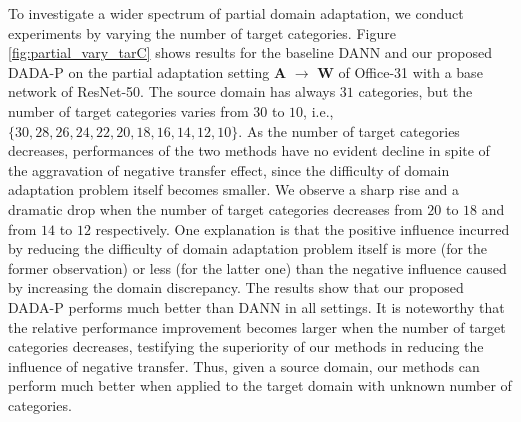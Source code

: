 \documentclass[letterpaper]{article} \usepackage{aaai20}  \usepackage{times}  \usepackage{helvet} \usepackage{courier}  \usepackage[hyphens]{url}  \usepackage{graphicx} \urlstyle{rm} \def\UrlFont{\rm}  \usepackage{graphicx}  \frenchspacing  \setlength{\pdfpagewidth}{8.5in}  \setlength{\pdfpageheight}{11in}
\begin{document}
To investigate a wider spectrum of partial domain adaptation, we conduct experiments by varying the number of target categories. Figure \ref{fig:partial_vary_tarC} shows results for the baseline DANN \cite{dann} and our proposed DADA-P on the partial adaptation setting \textbf{A} $\rightarrow$ \textbf{W} of Office-31 with a base network of ResNet-50.  The source domain has always $31$ categories, but the number of target categories varies from $30$ to $10$, i.e., $\{30, 28, 26, 24, 22, 20, 18, 16, 14, 12, 10\}$. As the number of target categories decreases, performances of the two methods have no evident decline in spite of the aggravation of negative transfer effect, since the difficulty of domain adaptation problem itself becomes smaller. We observe a sharp rise and a dramatic drop when the number of target categories decreases from $20$ to $18$ and from $14$ to $12$ respectively. One explanation is that the positive influence incurred by reducing the difficulty of domain adaptation problem itself is more (for the former observation) or less (for the latter one) than the negative influence caused by increasing the domain discrepancy. The results show that our proposed DADA-P performs much better than DANN in all settings. It is noteworthy that the relative performance improvement becomes larger when the number of target categories decreases, testifying the superiority of our methods in reducing the influence of negative transfer. Thus, given a source domain, our methods can perform much better when applied to the target domain with unknown number of categories.
\end{document}
